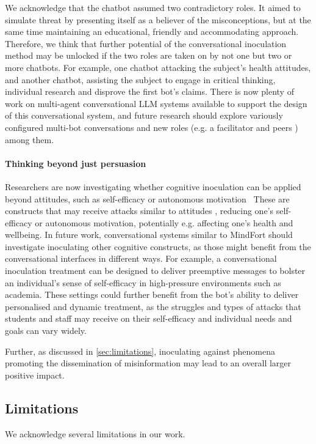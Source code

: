 \documentclass[sigconf]{acmart}
\begin{document}
We acknowledge that the chatbot assumed two contradictory roles. It aimed to simulate threat by presenting itself as a believer of the misconceptions, but at the same time maintaining an educational, friendly and accommodating approach. Therefore, we think that further potential of the conversational inoculation method may be unlocked if the two roles are taken on by not one but two or more chatbots. For example, one chatbot attacking the subject's health attitudes, and another chatbot, assisting the subject to engage in critical thinking, individual research and disprove the first bot's claims. There is now plenty of work on multi-agent conversational LLM systems available \cite{geng2025beyond, Becker_2024,Ye_Liu_Wu_Pang_Yin_Bai_Chen_2025, Yan_Zhang_Zhang_Zhang_Zhou_Miao_Li_2025} to support the design of this conversational system, and future research should explore variously configured multi-bot conversations and new roles (e.g. a facilitator and peers \cite{geng2025beyond}) among them.

\paragraph{Thinking beyond just persuasion}

Researchers are now investigating whether cognitive inoculation can be applied beyond attitudes, such as self-efficacy or autonomous motivation~\cite{Compton_2024}
These are constructs that may receive attacks similar to attitudes \cite{bandura77,reeve09}, reducing one's self-efficacy or autonomous motivation, potentially e.g. affecting one's health and wellbeing. 
In future work, conversational systems similar to MindFort should investigate inoculating other cognitive constructs, as those might benefit from the conversational interfaces in different ways.
For example, a conversational inoculation treatment can be designed to deliver preemptive messages to bolster an individual's sense of self-efficacy in high-pressure environments such as academia.
These settings could further benefit from the bot's ability to deliver personalised and dynamic treatment, as the struggles and types of attacks that students and staff may receive on their self-efficacy and individual needs and goals can vary widely. 

Further, as discussed in \autoref{sec:limitations}, inoculating against phenomena promoting the dissemination of misinformation may lead to an overall larger positive impact. 

\subsection{Limitations}
\label{sec:limitations}
We acknowledge several limitations in our work. 
\end{document}

